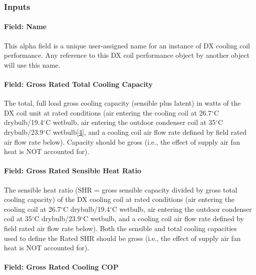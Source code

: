 \subsubsection{Inputs}\label{inputs-18-001}

\paragraph{Field: Name}\label{field-name-17-001}

This alpha field is a unique user-assigned name for an instance of DX cooling coil performance. Any reference to this DX coil performance object by another object will use this name.

\paragraph{Field: Gross Rated Total Cooling Capacity}\label{field-gross-rated-total-cooling-capacity-2}

The total, full load gross cooling capacity (sensible plus latent) in watts of the DX coil unit at rated conditions (air entering the cooling coil at 26.7$^\circ$C drybulb/19.4$^\circ$C wetbulb, air entering the outdoor condenser coil at 35$^\circ$C drybulb/23.9$^\circ$C wetbulb\protect\hyperlink{ux5fftn4}{{[}4{]}}, and a cooling coil air flow rate defined by field rated air flow rate below). Capacity should be gross (i.e., the effect of supply air fan heat is NOT accounted for).

\paragraph{Field: Gross Rated Sensible Heat Ratio}\label{field-gross-rated-sensible-heat-ratio-1}

The sensible heat ratio (SHR = gross sensible capacity divided by gross total cooling capacity) of the DX cooling coil at rated conditions (air entering the cooling coil at 26.7$^\circ$C drybulb/19.4$^\circ$C wetbulb, air entering the outdoor condenser coil at 35$^\circ$C drybulb/23.9$^\circ$C wetbulb, and a cooling coil air flow rate defined by field rated air flow rate below). Both the sensible and total cooling capacities used to define the Rated SHR should be gross (i.e., the effect of supply air fan heat is NOT accounted for).

\paragraph{Field: Gross Rated Cooling COP}\label{field-gross-rated-cooling-cop-1}

